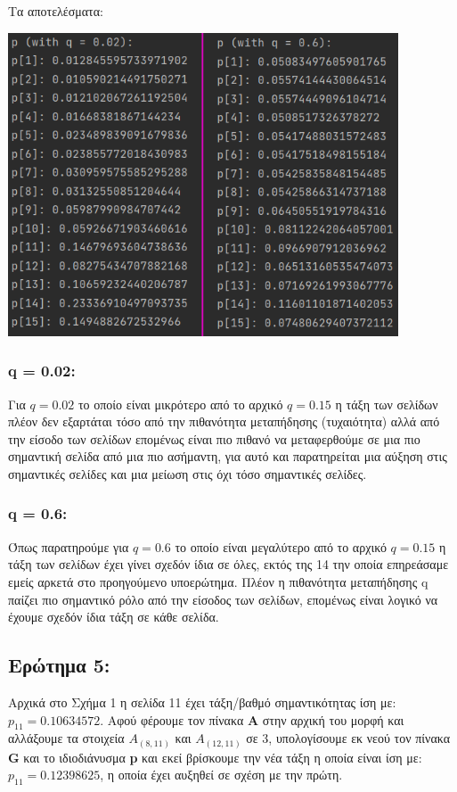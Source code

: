 \documentclass{article}
\begin{document}
    \pagebreak
    Τα αποτελέσματα:
    \begin{center}\includegraphics[height = 9cm]{images/results_32.png}\end{center}
    
    \subsubsection{q = 0.02:}
    Για \(q = 0.02\) το οποίο είναι μικρότερο από το αρχικό \(q = 0.15\) η τάξη των σελίδων πλέον δεν εξαρτάται τόσο από την πιθανότητα μεταπήδησης (τυχαιότητα) αλλά από την είσοδο των σελίδων επομένως είναι πιο πιθανό να μεταφερθούμε σε μια πιο σημαντική σελίδα από μια πιο ασήμαντη, για αυτό και παρατηρείται μια αύξηση στις σημαντικές σελίδες και μια μείωση στις όχι τόσο σημαντικές σελίδες.
    \subsubsection{q = 0.6:}
    Όπως παρατηρούμε για \(q = 0.6\) το οποίο είναι μεγαλύτερο από το αρχικό \(q = 0.15\) η τάξη των σελίδων έχει γίνει σχεδόν ίδια σε όλες, εκτός της 14 την οποία επηρεάσαμε εμείς αρκετά στο προηγούμενο υποερώτημα. Πλέον η πιθανότητα μεταπήδησης q παίζει πιο σημαντικό ρόλο από την είσοδος των σελίδων, επομένως είναι λογικό να έχουμε σχεδόν ίδια τάξη σε κάθε σελίδα.

\subsection{Ερώτημα 5:}
Αρχικά στο Σχήμα 1 η σελίδα 11 έχει τάξη/βαθμό σημαντικότητας ίση με: \(p_{11} = 0.10634572\). Αφού φέρουμε τον πίνακα \textbf{Α} στην αρχική του μορφή και αλλάξουμε τα στοιχεία \(A_{(8,11)}\) και \(A_{(12,11)}\) σε 3, υπολογίσουμε εκ νεού τον πίνακα \textbf{G} και το ιδιοδιάνυσμα \textbf{p} και εκεί βρίσκουμε την νέα τάξη η οποία είναι ίση με: \(p_{11} = 0.12398625\), η οποία έχει αυξηθεί σε σχέση με την πρώτη.
\end{document}
